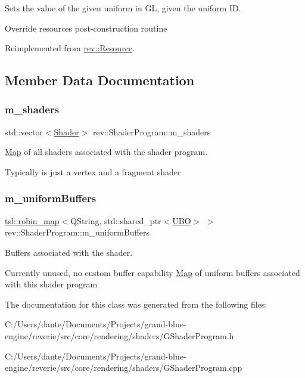 Sets the value of the given uniform in GL, given the uniform ID. 

Override resource\textquotesingle{}s post-\/construction routine 

Reimplemented from \mbox{\hyperlink{classrev_1_1_resource_a8a6daa71820d88c86bc6c0aa474d1af7}{rev\+::\+Resource}}.



\subsection{Member Data Documentation}
\mbox{\label{classrev_1_1_shader_program_a3618ab938eba35717c2f2f1f95ab3763}} 
\subsubsection{\texorpdfstring{m\_shaders}{m\_shaders}}
{\footnotesize\ttfamily std\+::vector$<$\mbox{\hyperlink{classrev_1_1_shader}{Shader}}$>$ rev\+::\+Shader\+Program\+::m\+\_\+shaders\hspace{0.3cm}{\ttfamily [protected]}}



\mbox{\hyperlink{classrev_1_1_map}{Map}} of all shaders associated with the shader program. 

Typically is just a vertex and a fragment shader \mbox{\label{classrev_1_1_shader_program_aa642643963ce7fd924d9bceb2a8991c7}} 
\subsubsection{\texorpdfstring{m\_uniformBuffers}{m\_uniformBuffers}}
{\footnotesize\ttfamily \mbox{\hyperlink{classtsl_1_1robin__map}{tsl\+::robin\+\_\+map}}$<$Q\+String, std\+::shared\+\_\+ptr$<$\mbox{\hyperlink{classrev_1_1_u_b_o}{U\+BO}}$>$ $>$ rev\+::\+Shader\+Program\+::m\+\_\+uniform\+Buffers\hspace{0.3cm}{\ttfamily [protected]}}



Buffers associated with the shader. 

Currently unused, no custom buffer capability \mbox{\hyperlink{classrev_1_1_map}{Map}} of uniform buffers associated with this shader program 

The documentation for this class was generated from the following files\+:\begin{DoxyCompactItemize}
\item 
C\+:/\+Users/dante/\+Documents/\+Projects/grand-\/blue-\/engine/reverie/src/core/rendering/shaders/G\+Shader\+Program.\+h\item 
C\+:/\+Users/dante/\+Documents/\+Projects/grand-\/blue-\/engine/reverie/src/core/rendering/shaders/G\+Shader\+Program.\+cpp\end{DoxyCompactItemize}
